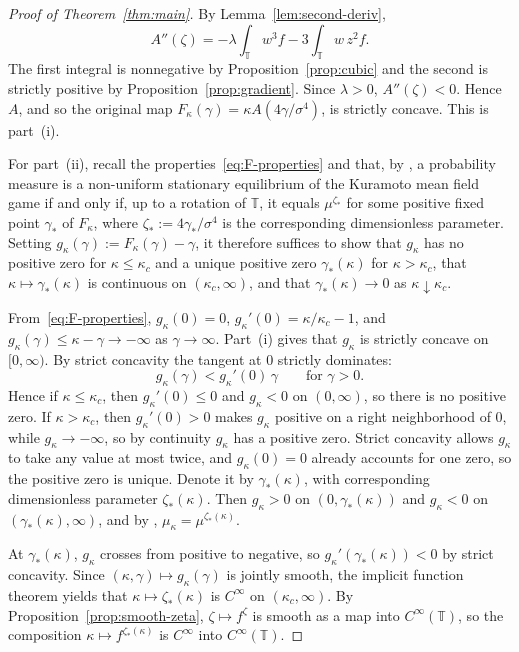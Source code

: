 \documentclass{amsart}
\newcommand{\T}{\mathbb T}
\begin{document}
\begin{proof}[Proof of Theorem~\ref{thm:main}]
By Lemma~\ref{lem:second-deriv},
\[
A''(\zeta)
=-\lambda\int_\T w^3 f
-3\int_\T w\,z^2 f.
\]
The first integral is nonnegative by Proposition~\ref{prop:cubic} and
the second is strictly positive by Proposition~\ref{prop:gradient}.
Since $\lambda>0$, $A''(\zeta)<0$. Hence $A$, and so the original map
$F_\kappa(\gamma)=\kappa A(4\gamma/\sigma^4)$, is strictly concave.
This is part~(i).

For part~(ii), recall the properties~\eqref{eq:F-properties} and
that, by \cite[Prop.~6.4]{CCS}, a probability measure is a
non-uniform stationary equilibrium of the Kuramoto mean field game if
and only if, up to a rotation of $\T$, it equals $\mu^{\zeta_*}$ for
some positive fixed point $\gamma_*$ of $F_\kappa$, where
$\zeta_*:=4\gamma_*/\sigma^4$ is the corresponding dimensionless
parameter. Setting
$g_\kappa(\gamma):=F_\kappa(\gamma)-\gamma$, it therefore suffices to
show that $g_\kappa$ has no positive zero for $\kappa\leq\kappa_c$ and
a unique positive zero $\gamma_*(\kappa)$ for $\kappa>\kappa_c$, that
$\kappa\mapsto\gamma_*(\kappa)$ is continuous on $(\kappa_c,\infty)$,
and that $\gamma_*(\kappa)\to 0$ as $\kappa\downarrow\kappa_c$.

From~\eqref{eq:F-properties}, $g_\kappa(0)=0$,
$g_\kappa'(0)=\kappa/\kappa_c-1$, and
$g_\kappa(\gamma)\leq\kappa-\gamma\to-\infty$ as $\gamma\to\infty$.
Part~(i) gives that $g_\kappa$ is strictly concave on $[0,\infty)$. By
strict concavity the tangent at $0$ strictly dominates:
\begin{equation}\label{eq:tangent-bound}
g_\kappa(\gamma)<g_\kappa'(0)\,\gamma\qquad\text{for }\gamma>0.
\end{equation} Hence if
$\kappa\leq\kappa_c$, then $g_\kappa'(0)\leq 0$ and $g_\kappa<0$ on
$(0,\infty)$, so there is no positive zero. If $\kappa>\kappa_c$, then
$g_\kappa'(0)>0$ makes $g_\kappa$ positive on a right neighborhood of
$0$, while $g_\kappa\to-\infty$, so by continuity $g_\kappa$ has a
positive zero. Strict concavity allows $g_\kappa$ to take any value at
most twice, and $g_\kappa(0)=0$ already accounts for one zero, so the
positive zero is unique. Denote it by $\gamma_*(\kappa)$, with
corresponding dimensionless parameter $\zeta_*(\kappa)$. Then $g_\kappa>0$ on $(0,\gamma_*(\kappa))$ and $g_\kappa<0$
on $(\gamma_*(\kappa),\infty)$, and by \cite[Prop.~6.4]{CCS},
$\mu_\kappa=\mu^{\zeta_*(\kappa)}$.

At $\gamma_*(\kappa)$, $g_\kappa$ crosses from positive to negative,
so $g_\kappa'(\gamma_*(\kappa))<0$ by strict concavity. Since
$(\kappa,\gamma)\mapsto g_\kappa(\gamma)$ is jointly smooth, the
implicit function theorem yields that $\kappa\mapsto\zeta_*(\kappa)$
is $C^\infty$ on $(\kappa_c,\infty)$. By
Proposition~\ref{prop:smooth-zeta}, $\zeta\mapsto f^\zeta$ is smooth
as a map into $C^\infty(\T)$, so the composition
$\kappa\mapsto f^{\zeta_*(\kappa)}$ is $C^\infty$ into $C^\infty(\T)$.


\end{proof}
\end{document}
